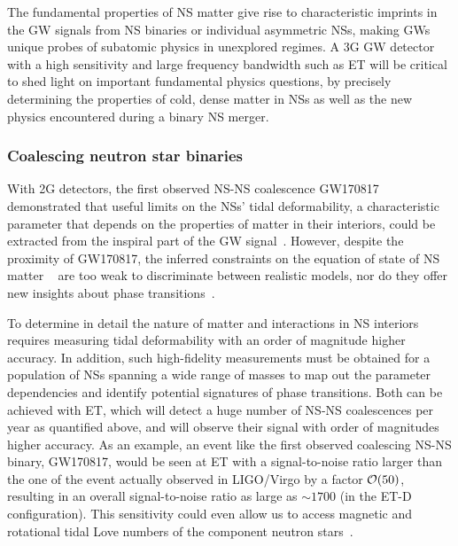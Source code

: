 The fundamental properties of NS matter give rise to characteristic imprints in the GW signals from NS binaries or individual asymmetric NSs, making GWs unique probes of subatomic physics in unexplored regimes. A 3G GW detector with a high sensitivity and large frequency bandwidth such as ET will be critical to shed light on important fundamental physics questions, by precisely determining the properties of cold, dense matter in NSs as well as the new physics encountered during a binary NS merger.






\subsubsection{Coalescing neutron star binaries} 
With 2G detectors, the first observed NS-NS coalescence
GW170817 demonstrated that useful limits on the NSs' tidal deformability, a characteristic parameter that depends on the properties of matter in their interiors, could be extracted from the inspiral part of the GW signal~\cite{TheLIGOScientific:2017qsa}. However, despite the proximity of GW170817, the inferred constraints on the equation of state of NS matter ~\cite{Abbott:2018exr}
are too weak to discriminate between realistic models, nor do they offer 
new insights about phase transitions~\cite{Hebeler:2010jx,Gandolfi:2011xu,Tews:2018kmu}. 


To determine in detail the nature of matter and interactions in NS interiors requires measuring tidal deformability with an order of magnitude higher accuracy. In addition, such high-fidelity measurements must be obtained for a population of NSs spanning a wide range of masses to map out the parameter dependencies and identify potential signatures of phase transitions. Both can be achieved with ET, which will detect a huge number of NS-NS coalescences per year as quantified above, and will observe their signal with order of magnitudes higher accuracy. As an example, an event like the first observed coalescing NS-NS binary, GW170817, would be seen at ET with a signal-to-noise ratio larger than the one of the event actually observed 
in LIGO/Virgo by a factor ${\cal O}(50)$, resulting in an overall signal-to-noise ratio as large 
as $\sim 1700$ (in the ET-D configuration).
This sensitivity could even allow us to access magnetic and rotational tidal Love numbers of the component neutron stars~\cite{Jimenez-Forteza:2018buh}.

